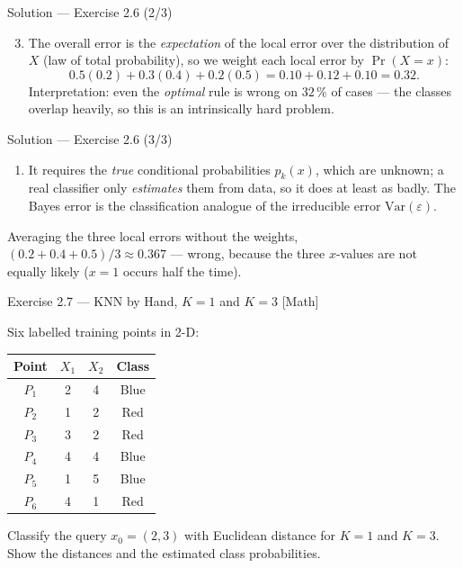 \documentclass[aspectratio=169,11pt]{beamer}
\begin{document}
\begin{frame}{Solution --- Exercise 2.6 (2/3)}
\begin{solutionbox}
\begin{enumerate}\setcounter{enumi}{2}
  \item The overall error is the \emph{expectation} of the local error
        over the distribution of $X$ (law of total probability), so we
        weight each local error by $\Pr(X=x)$:
        \[
          0.5(0.2)+0.3(0.4)+0.2(0.5)=0.10+0.12+0.10=\mathbf{0.32}.
        \]
        Interpretation: even the \emph{optimal} rule is wrong on
        $32\,\%$ of cases --- the classes overlap heavily, so this is
        an intrinsically hard problem.
  \end{enumerate}
\end{solutionbox}
\end{frame}

\begin{frame}{Solution --- Exercise 2.6 (3/3)}
\begin{solutionbox}
  \begin{enumerate}
  \item It requires the \emph{true} conditional probabilities
        $p_k(x)$, which are unknown; a real classifier only
        \emph{estimates} them from data, so it does at least as badly.
        The Bayes error is the classification analogue of the
        irreducible error $\mathrm{Var}(\varepsilon)$.
\end{enumerate}
\end{solutionbox}
\begin{mistake}
Averaging the three local errors without the
weights, $(0.2+0.4+0.5)/3\approx0.367$ --- wrong, because the three
$x$-values are not equally likely ($x=1$ occurs half the time).
\end{mistake}
\end{frame}

\begin{frame}{Exercise 2.7 --- KNN by Hand, $K=1$ and $K=3$ [Math]}
\begin{exercise}
Six labelled training points in 2-D:
\begin{center}\footnotesize
\begin{tabular}{cccc}
\toprule
Point & $X_1$ & $X_2$ & Class \\
\midrule
$P_1$ & 2 & 4 & Blue \\
$P_2$ & 1 & 2 & Red \\
$P_3$ & 3 & 2 & Red \\
$P_4$ & 4 & 4 & Blue \\
$P_5$ & 1 & 5 & Blue \\
$P_6$ & 4 & 1 & Red \\
\bottomrule
\end{tabular}
\end{center}
Classify the query $x_0=(2,3)$ with Euclidean distance for
\textbf{$K=1$} and \textbf{$K=3$}. Show the distances and the
estimated class probabilities.
\end{exercise}
\end{frame}
\end{document}
